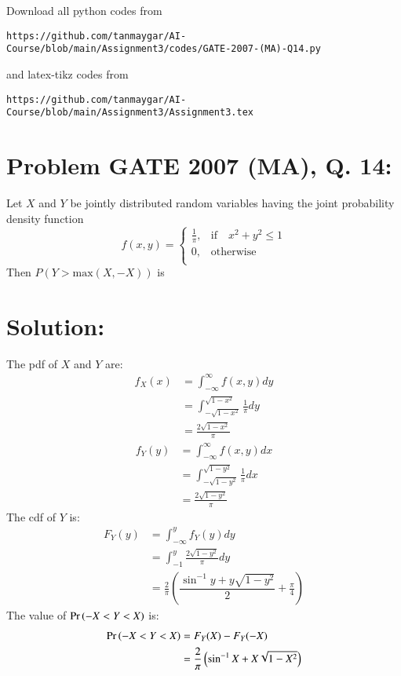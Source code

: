 \documentclass[journal,12pt,twocolumn]{IEEEtran}
\begin{document}
Download all python codes from 
\begin{lstlisting}
https://github.com/tanmaygar/AI-Course/blob/main/Assignment3/codes/GATE-2007-(MA)-Q14.py
\end{lstlisting}
%
and latex-tikz codes from 
%
\begin{lstlisting}
https://github.com/tanmaygar/AI-Course/blob/main/Assignment3/Assignment3.tex
\end{lstlisting}
\section*{Problem GATE 2007 (MA), Q. 14: }
Let $X$ and $Y$ be jointly distributed random
variables having the joint probability
density function
\[
f(x,y) = \begin{cases}
            \frac{1}{\pi}, &\text{if}\quad x^2 + y^2 \leq 1\\
             0, &\text{otherwise}\\
            \end{cases}
\]
Then $P(Y > \text{max}(X,-X))$ is

\section*{Solution:}
The pdf of $X$ and $Y$ are:
\begin{align}
    f_X(x)&=\int_{-\infty}^{\infty}f(x,y)dy\\
    &=\int_{-\sqrt{1-x^2}}^{\sqrt{1-x^2}}\frac{1}{\pi}dy\\
    &=\frac{2\sqrt{1-x^2}}{\pi}
\end{align}
\begin{align}
    f_Y(y)&=\int_{-\infty}^{\infty}f(x,y)dx\\
    &=\int_{-\sqrt{1-y^2}}^{\sqrt{1-y^2}}\frac{1}{\pi}dx\\
    &=\frac{2\sqrt{1-y^2}}{\pi}
\end{align}
The cdf of $Y$ is:
\begin{align}
    F_Y(y)&=\int_{-\infty}^{y}f_Y(y)dy\\
    &=\int_{-1}^{y}\frac{2\sqrt{1-y^2}}{\pi}dy\\
    &=\frac{2}{\pi}\left(\dfrac{\sin^{-1}{y} + y\sqrt{1-y^2}}{2} + \frac{\pi}{4}\right)
\end{align}
The value of $\Pr\left(-X<Y<X\right)$ is:
\begin{align}
\Pr\left(-X<Y<X\right) &=F_Y(X)-F_Y(-X)\\
 &=\frac{2}{\pi}\left(\sin^{-1}{X} + X\sqrt{1-X^2}\right)
\end{align}
\end{document}
